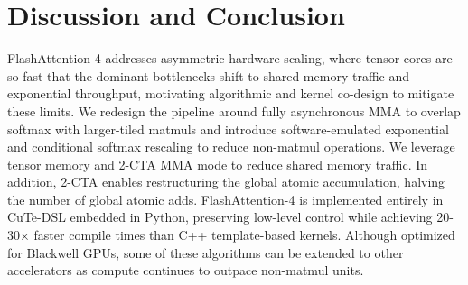\section{Discussion and Conclusion}
\label{sec:conclusion}

FlashAttention-4 addresses asymmetric hardware scaling, where tensor cores are so fast that the dominant bottlenecks shift to shared-memory traffic and exponential throughput, motivating algorithmic and kernel co-design to mitigate these limits. We redesign the pipeline around fully asynchronous MMA to overlap softmax with larger-tiled matmuls and introduce software-emulated exponential and conditional softmax rescaling to reduce non-matmul operations. We leverage tensor memory and 2-CTA MMA mode to reduce shared memory traffic. In addition, 2-CTA enables restructuring the global atomic accumulation, halving the number of global atomic adds. FlashAttention-4 is implemented entirely in CuTe-DSL embedded in Python, preserving low-level control while achieving 20-30× faster compile times than C++ template-based kernels. Although optimized for Blackwell GPUs, some of these algorithms can be extended to other accelerators as compute continues to outpace non-matmul units.
